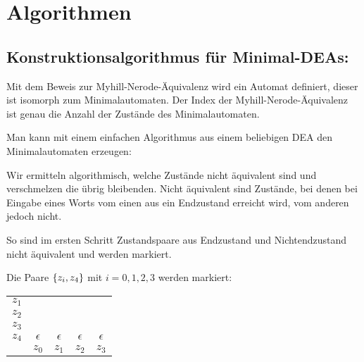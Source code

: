 \chapter{Algorithmen}
\section{Konstruktionsalgorithmus für Minimal-DEAs:}
Mit dem Beweis zur Myhill-Nerode-Äquivalenz wird ein Automat definiert, dieser ist isomorph zum Minimalautomaten.
Der Index der Myhill-Nerode-Äquivalenz ist genau die Anzahl der Zustände des Minimalautomaten.

Man kann mit einem einfachen Algorithmus aus einem beliebigen DEA den Minimalautomaten erzeugen:

Wir ermitteln algorithmisch, welche Zustände nicht äquivalent sind und verschmelzen die übrig bleibenden.
Nicht äquivalent sind Zustände, bei denen bei Eingabe eines Worts vom einen aus ein Endzustand erreicht wird, vom anderen jedoch nicht.

So sind im ersten Schritt Zustandspaare aus Endzustand und Nichtendzustand nicht äquivalent und werden markiert.

\vspace{1em}


Die Paare $\left\{ z_i,z_4 \right\}$ mit $i=0,1,2,3$ werden markiert:

\begin{tabular}{ccccc}
	\cline{2-2}
	$z_1$ & 	\multicolumn{1}{|c|}{ }		&				&				&			 \\
	\cline{2-3}
	$z_2$ & 	\multicolumn{1}{|c|}{ }		&		\multicolumn{1}{|c|}{ }		&				&			 \\
	\cline{2-4}
	$z_3$ & 	\multicolumn{1}{|c|}{ }		&		\multicolumn{1}{|c|}{ }		&		\multicolumn{1}{|c|}{ }		&			 \\
	\cline{2-5}
	$z_4$ & 	\multicolumn{1}{|c|}{$\epsilon$}		&		\multicolumn{1}{|c|}{$\epsilon$}		&		\multicolumn{1}{|c|}{$\epsilon$}		&		\multicolumn{1}{|c|}{$\epsilon$}	 \\
	\cline{2-5}
				& $z_0$ & $z_1$ & $z_2$ & $z_3$\\
\end{tabular}

